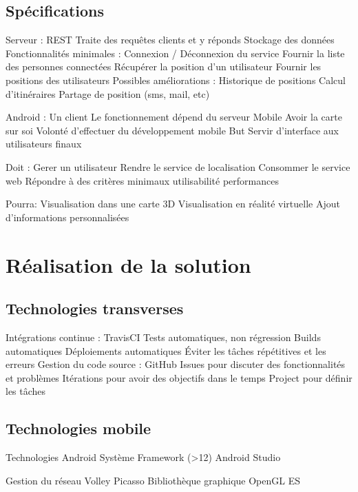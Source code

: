 \documentclass{beamer} %
\begin{document}
\subsection{Spécifications}
\begin{frame}{\subsecname}
  Serveur :
  REST
  Traite des requêtes clients et y réponds
  Stockage des données
  Fonctionnalités minimales :
  Connexion / Déconnexion du service
  Fournir la liste des personnes connectées
  Récupérer la position  d’un utilisateur
  Fournir les positions des utilisateurs
  Possibles améliorations :
  Historique de positions
  Calcul d’itinéraires
  Partage de position (sms, mail, etc)
\end{frame}

\begin{frame}{\subsecname}
  Android :
  Un client
  Le fonctionnement dépend du serveur
  Mobile
    Avoir la carte sur soi
    Volonté d'effectuer du développement mobile
  But
    Servir d'interface aux utilisateurs finaux

  Doit :
  Gerer un utilisateur
  Rendre le service de localisation
  Consommer le service web
  Répondre à des critères minimaux
    utilisabilité
    performances

  Pourra:
  Visualisation dans une carte 3D
  Visualisation en réalité virtuelle
  Ajout d'informations personnalisées
\end{frame}


\section{Réalisation de la solution}
\subsection{Technologies transverses}
\begin{frame}{\subsecname}
  Intégrations continue :
  TravisCI
  Tests automatiques, non régression
  Builds automatiques
  Déploiements automatiques
  Éviter les tâches répétitives et les erreurs
  Gestion du code source :
  GitHub
  Issues pour discuter des fonctionnalités et problèmes
  Itérations pour avoir des objectifs dans le temps
  Project pour définir les tâches  
\end{frame}

\subsection{Technologies mobile}
\begin{frame}{\subsecname}
  Technologies
  Android
  Système
  Framework (>12)
  Android Studio

  Gestion du réseau
  Volley
  Picasso
  Bibliothèque graphique
  OpenGL ES
\end{frame}
\end{document}
